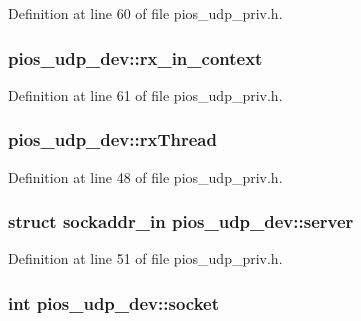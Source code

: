 Definition at line 60 of file pios\-\_\-udp\-\_\-priv.\-h.

\hypertarget{structpios__udp__dev_ab49ecb80839ac809a20ae3db49d63919}{
\subsubsection[{rx\-\_\-in\-\_\-context}]{ pios\-\_\-udp\-\_\-dev\-::rx\-\_\-in\-\_\-context}}\label{structpios__udp__dev_ab49ecb80839ac809a20ae3db49d63919}


Definition at line 61 of file pios\-\_\-udp\-\_\-priv.\-h.

\hypertarget{structpios__udp__dev_aaa9155c25ada819e91b4e8041bd67e7a}{
\subsubsection[{rx\-Thread}]{ pios\-\_\-udp\-\_\-dev\-::rx\-Thread}}\label{structpios__udp__dev_aaa9155c25ada819e91b4e8041bd67e7a}


Definition at line 48 of file pios\-\_\-udp\-\_\-priv.\-h.

\hypertarget{structpios__udp__dev_a802c81cfccce81f5e9774a3f2fb7a449}{
\subsubsection[{server}]{\setlength{\rightskip}{0pt plus 5cm}struct sockaddr\-\_\-in pios\-\_\-udp\-\_\-dev\-::server}}\label{structpios__udp__dev_a802c81cfccce81f5e9774a3f2fb7a449}


Definition at line 51 of file pios\-\_\-udp\-\_\-priv.\-h.

\hypertarget{structpios__udp__dev_ad5d46c15339fd00e047ab83898aabc20}{
\subsubsection[{socket}]{\setlength{\rightskip}{0pt plus 5cm}int pios\-\_\-udp\-\_\-dev\-::socket}}\label{structpios__udp__dev_ad5d46c15339fd00e047ab83898aabc20}


